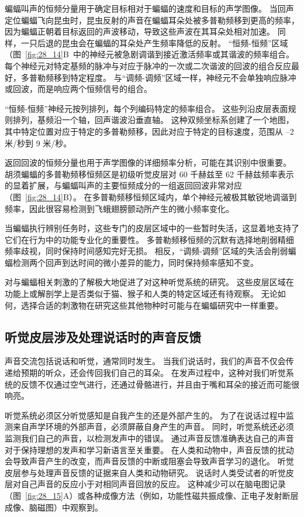 蝙蝠叫声的恒频分量用于确定目标相对于蝙蝠的速度和目标的声学图像。
当回声定位蝙蝠飞向昆虫时，昆虫反射的声音在蝙蝠耳朵处被多普勒频移到更高的频率，因为蝙蝠正朝着目标返回的声波移动，导致这些声波在其耳朵处相对加速。
同样，一只后退的昆虫会在蝙蝠的耳朵处产生频率降低的反射。
“恒频-恒频”区域（图~\ref{fig:28_14}B~中的神经元被急剧调谐到接近激活频率或其谐波的频率组合。
每个神经元对特定基频的脉冲与对应于脉冲的一次或二次谐波的回波的组合反应最好，多普勒频移到特定程度。
与“调频-调频”区域一样，神经元不会单独响应脉冲或回波，而是响应两个恒频信号的组合。


“恒频-恒频”神经元按列排列，每个列编码特定的频率组合。
这些列沿皮层表面规则排列，基频沿一个轴，回声谐波沿垂直轴。
这种双频坐标系创建了一个地图，其中特定位置对应于特定的多普勒频移，因此对应于特定的目标速度，范围从 –2 米/秒到 9 米/秒。


返回回波的恒频分量也用于声学图像的详细频率分析，可能在其识别中很重要。
胡须蝙蝠的多普勒频移恒频区是初级听觉皮层对 60 千赫兹至 62 千赫兹频率表示的显着扩展，与蝙蝠叫声的主要恒频成分的一组返回回波非常对应（图~\ref{fig:28_14}B）。
在多普勒频移恒频区域内，单个神经元被极其敏锐地调谐到频率，因此很容易检测到飞蛾翅膀颤动所产生的微小频率变化。


当蝙蝠执行辨别任务时，这些专门的皮层区域中的一些暂时失活，这显着地支持了它们在行为中的功能专业化的重要性。
多普勒频移恒频的沉默有选择地削弱精细频率歧视，同时保持时间感知完好无损。
相反，“调频-调频”区域的失活会削弱蝙蝠检测两个回声到达时间的微小差异的能力，同时保持频率感知不变。


对与蝙蝠相关刺激的了解极大地促进了对这种听觉系统的研究。
这些皮层区域在功能上或解剖学上是否类似于猫、猴子和人类的特定区域还有待观察。
无论如何，选择合适的刺激物在研究这些其他物种时可能与在蝙蝠研究中一样重要。



\subsection{听觉皮层涉及处理说话时的声音反馈}

声音交流包括说话和听觉，通常同时发生。
当我们说话时，我们的声音不仅会传递给预期的听众，还会传回我们自己的耳朵。
在发声过程中，这种对我们听觉系统的反馈不仅通过空气进行，还通过骨骼进行，并且由于嘴和耳朵的接近而可能很响亮。


听觉系统必须区分听觉感知是自我产生的还是外部产生的。
为了在说话过程中监测来自声学环境的外部声音，必须屏蔽自身产生的声音。
同时，听觉系统还必须监测我们自己的声音，以检测发声中的错误。
通过声音反馈准确表达自己的声音对于保持理想的发声和学习新语言至关重要。
在人类和动物中，声音反馈的扰动会导致声音产生的改变，而声音反馈的中断或阻塞会导致声音学习的退化。
听觉皮层参与处理声音反馈的证据来自人类和动物研究。
说话时人类受试者的听觉皮层对自己声音的反应小于对相同声音回放的反应。
这种减少可以在脑电图记录（图~\ref{fig:28_15}A）或各种成像方法（例如，功能性磁共振成像、正电子发射断层成像、脑磁图）中观察到。


